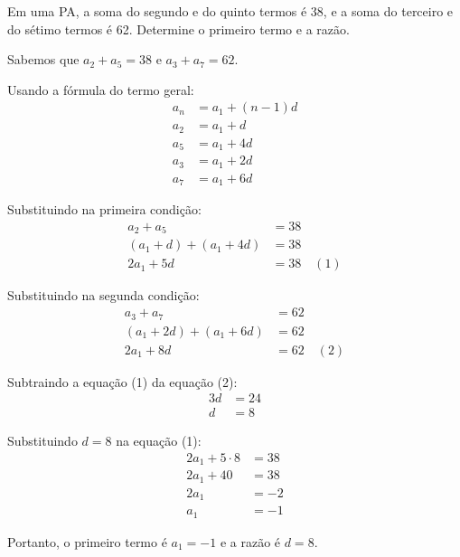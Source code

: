 \documentclass[12pt,a4paper]{article}
\begin{document}
\begin{tcolorbox}[colback=blue!5!white,colframe=blue!75!black,title=Exercício Adicional 10]
Em uma PA, a soma do segundo e do quinto termos é 38, e a soma do terceiro e do sétimo termos é 62. Determine o primeiro termo e a razão.
\end{tcolorbox}

\begin{tcolorbox}[colback=green!5!white,colframe=green!75!black,title=Resolução]
Sabemos que $a_2 + a_5 = 38$ e $a_3 + a_7 = 62$.

Usando a fórmula do termo geral:
\begin{align}
a_n &= a_1 + (n-1)d\\
a_2 &= a_1 + d\\
a_5 &= a_1 + 4d\\
a_3 &= a_1 + 2d\\
a_7 &= a_1 + 6d
\end{align}

Substituindo na primeira condição:
\begin{align}
a_2 + a_5 &= 38\\
(a_1 + d) + (a_1 + 4d) &= 38\\
2a_1 + 5d &= 38 \quad (1)
\end{align}

Substituindo na segunda condição:
\begin{align}
a_3 + a_7 &= 62\\
(a_1 + 2d) + (a_1 + 6d) &= 62\\
2a_1 + 8d &= 62 \quad (2)
\end{align}

Subtraindo a equação (1) da equação (2):
\begin{align}
3d &= 24\\
d &= 8
\end{align}

Substituindo $d = 8$ na equação (1):
\begin{align}
2a_1 + 5 \cdot 8 &= 38\\
2a_1 + 40 &= 38\\
2a_1 &= -2\\
a_1 &= -1
\end{align}

Portanto, o primeiro termo é $a_1 = -1$ e a razão é $d = 8$.
\end{tcolorbox}
\end{document}
